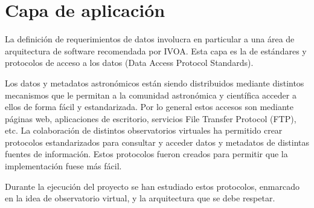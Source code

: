 \section{Capa de aplicación}


La definición de requerimientos de datos involucra en particular a una área de
arquitectura de software recomendada por IVOA. Esta capa es la de
estándares y protocolos de acceso a los datos (Data Access Protocol Standards).

Los datos y metadatos astronómicos están siendo distribuidos mediante distintos
mecanismos que le permitan a la comunidad astronómica y científica acceder a
ellos de forma fácil y estandarizada. Por lo general estos accesos son mediante
páginas web, aplicaciones de escritorio, servicios File Transfer Protocol
(FTP), etc. La colaboración de distintos observatorios virtuales ha permitido
crear protocolos estandarizados para consultar y acceder datos y metadatos de
distintas fuentes de información. Estos protocolos fueron creados para permitir
que la implementación fuese más fácil.

Durante la ejecución del proyecto se han estudiado estos protocolos, enmarcado
en la idea de observatorio virtual, y la arquitectura que se debe respetar.

